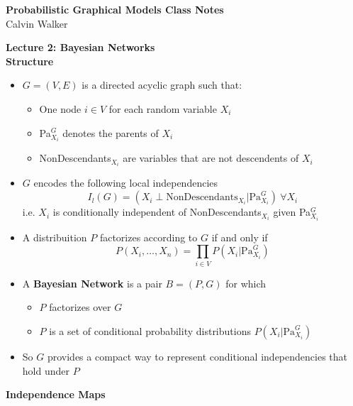 \documentclass{article}
\begin{document}
\begin{center}
    \textbf{Probabilistic Graphical Models Class Notes} \\[0.25ex]
    Calvin Walker
\end{center}
\textbf{Lecture 2: Bayesian Networks} \\[0.5ex]
\textbf{Structure} 
\begin{itemize}
    \item $G = (V, E)$ is a directed acyclic graph such that: 
    \begin{itemize}
        \item One node $i \in V$ for each random variable $X_i$
        \item Pa$^G_{X_i}$ denotes the parents of $X_i$
        \item NonDescendants$_{X_i}$ are variables that are not descendents of $X_i$
    \end{itemize}
    \item $G$ encodes the following local independencies \begin{equation*}
        I_{l}(G) = (X_i \perp \text{NonDescendants}_{X_i} | \text{Pa}^G_{X_i})\ \forall X_i
    \end{equation*}
    i.e. $X_i$ is conditionally independent of NonDescendants$_{X_i}$ given Pa$^G_{X_i}$
\end{itemize}
\begin{itemize}
    \item A distribuition $P$ factorizes according to $G$ if and only if \begin{equation*}
        P(X_i, \dots , X_n) = \prod_{i \in V}P(X_i | \text{Pa}^G_{X_i})
    \end{equation*}
    \item A \textbf{Bayesian Network} is a pair $B = (P, G)$ for which \begin{itemize}
        \item $P$ factorizes over $G$
        \item $P$ is a set of conditional probability distributions $P(X_i|\text{Pa}^G_{X_i})$
    \end{itemize}
    \item So $G$ provides a compact way to represent conditional independencies that hold under $P$
\end{itemize}
\textbf{Independence Maps}
\end{document}

